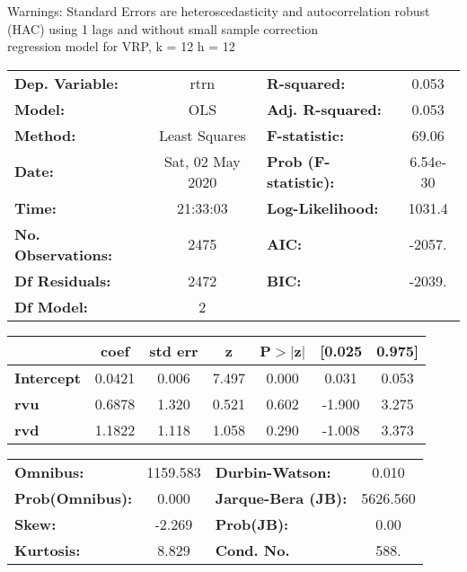 Warnings: \newline
 [1] Standard Errors are heteroscedasticity and autocorrelation robust (HAC) using 1 lags and without small sample correction\\ 

regression model for VRP, k = 12 h = 12\begin{center}
\begin{tabular}{lclc}
\toprule
\textbf{Dep. Variable:}    &       rtrn       & \textbf{  R-squared:         } &     0.053   \\
\textbf{Model:}            &       OLS        & \textbf{  Adj. R-squared:    } &     0.053   \\
\textbf{Method:}           &  Least Squares   & \textbf{  F-statistic:       } &     69.06   \\
\textbf{Date:}             & Sat, 02 May 2020 & \textbf{  Prob (F-statistic):} &  6.54e-30   \\
\textbf{Time:}             &     21:33:03     & \textbf{  Log-Likelihood:    } &    1031.4   \\
\textbf{No. Observations:} &        2475      & \textbf{  AIC:               } &    -2057.   \\
\textbf{Df Residuals:}     &        2472      & \textbf{  BIC:               } &    -2039.   \\
\textbf{Df Model:}         &           2      & \textbf{                     } &             \\
\bottomrule
\end{tabular}
\begin{tabular}{lcccccc}
                   & \textbf{coef} & \textbf{std err} & \textbf{z} & \textbf{P$> |$z$|$} & \textbf{[0.025} & \textbf{0.975]}  \\
\midrule
\textbf{Intercept} &       0.0421  &        0.006     &     7.497  &         0.000        &        0.031    &        0.053     \\
\textbf{rvu}       &       0.6878  &        1.320     &     0.521  &         0.602        &       -1.900    &        3.275     \\
\textbf{rvd}       &       1.1822  &        1.118     &     1.058  &         0.290        &       -1.008    &        3.373     \\
\bottomrule
\end{tabular}
\begin{tabular}{lclc}
\textbf{Omnibus:}       & 1159.583 & \textbf{  Durbin-Watson:     } &    0.010  \\
\textbf{Prob(Omnibus):} &   0.000  & \textbf{  Jarque-Bera (JB):  } & 5626.560  \\
\textbf{Skew:}          &  -2.269  & \textbf{  Prob(JB):          } &     0.00  \\
\textbf{Kurtosis:}      &   8.829  & \textbf{  Cond. No.          } &     588.  \\
\bottomrule
\end{tabular}
\end{center}

